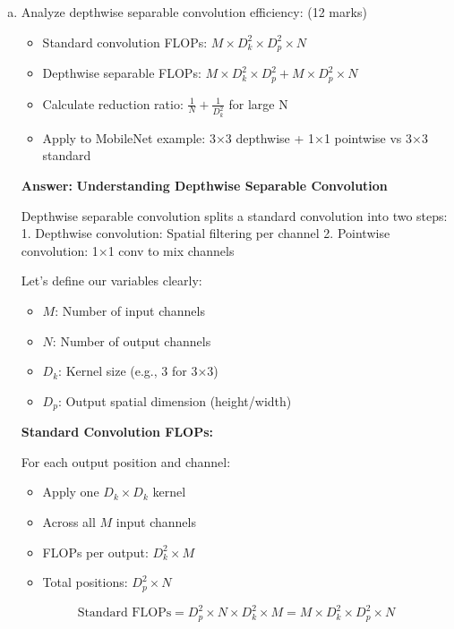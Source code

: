 \documentclass[12pt]{article}
\newcommand{\answer}[1]{{\color{answercolor}\textbf{Answer:} #1}}
\newcommand{\explanation}[1]{{\color{explanationcolor}#1}}
\begin{document}
\begin{enumerate}[(a)]
    \item Analyze depthwise separable convolution efficiency: \hfill (12 marks)
    \begin{itemize}
        \item Standard convolution FLOPs: $M \times D_k^2 \times D_p^2 \times N$
        \item Depthwise separable FLOPs: $M \times D_k^2 \times D_p^2 + M \times D_p^2 \times N$
        \item Calculate reduction ratio: $\frac{1}{N} + \frac{1}{D_k^2}$ for large N
        \item Apply to MobileNet example: 3×3 depthwise + 1×1 pointwise vs 3×3 standard
    \end{itemize}
    
    \answer{
    \textbf{Understanding Depthwise Separable Convolution}
    
    \explanation{
    Depthwise separable convolution splits a standard convolution into two steps:
    1. Depthwise convolution: Spatial filtering per channel
    2. Pointwise convolution: 1×1 conv to mix channels
    
    Let's define our variables clearly:
    \begin{itemize}
        \item $M$: Number of input channels
        \item $N$: Number of output channels
        \item $D_k$: Kernel size (e.g., 3 for 3×3)
        \item $D_p$: Output spatial dimension (height/width)
    \end{itemize}
    }
    
    \textbf{Standard Convolution FLOPs:}
    
    \explanation{
    For each output position and channel:
    \begin{itemize}
        \item Apply one $D_k \times D_k$ kernel
        \item Across all $M$ input channels
        \item FLOPs per output: $D_k^2 \times M$
        \item Total positions: $D_p^2 \times N$
    \end{itemize}
    
    \[\boxed{\text{Standard FLOPs} = D_p^2 \times N \times D_k^2 \times M = M \times D_k^2 \times D_p^2 \times N}\]
    }
    
}
\end{enumerate}
\end{document}
